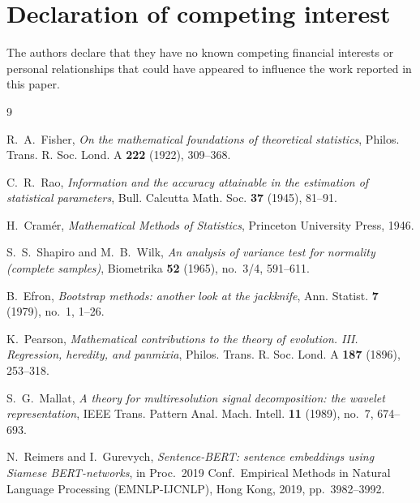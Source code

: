 \documentclass[11pt,a4paper,oneside]{article}
\theoremstyle{definition}
\begin{document}
\section*{Declaration of competing interest}

The authors declare that they have no known competing financial interests or personal
relationships that could have appeared to influence the work reported in this paper.

\begin{thebibliography}{9}

 R.~A.~Fisher, \emph{On the mathematical foundations of theoretical
statistics}, Philos. Trans. R. Soc. Lond. A \textbf{222} (1922), 309--368.

 C.~R.~Rao, \emph{Information and the accuracy attainable in the estimation of
statistical parameters}, Bull. Calcutta Math. Soc. \textbf{37} (1945), 81--91.

 H.~Cram\'er, \emph{Mathematical Methods of Statistics}, Princeton University
Press, 1946.

 S.~S.~Shapiro and M.~B.~Wilk, \emph{An analysis of variance test for
normality (complete samples)}, Biometrika \textbf{52} (1965), no.~3/4, 591--611.

 B.~Efron, \emph{Bootstrap methods: another look at the jackknife}, Ann.
Statist. \textbf{7} (1979), no.~1, 1--26.

 K.~Pearson, \emph{Mathematical contributions to the theory of evolution.
III. Regression, heredity, and panmixia}, Philos. Trans. R. Soc. Lond. A \textbf{187} (1896),
253--318.

 S.~G.~Mallat, \emph{A theory for multiresolution signal decomposition: the
wavelet representation}, IEEE Trans. Pattern Anal. Mach. Intell. \textbf{11} (1989), no.~7,
674--693.

 N.~Reimers and I.~Gurevych, \emph{Sentence-BERT: sentence
embeddings using Siamese BERT-networks}, in Proc.\ 2019 Conf.\ Empirical Methods in Natural
Language Processing (EMNLP-IJCNLP), Hong Kong, 2019, pp.~3982--3992.

\end{thebibliography}
\end{document}
